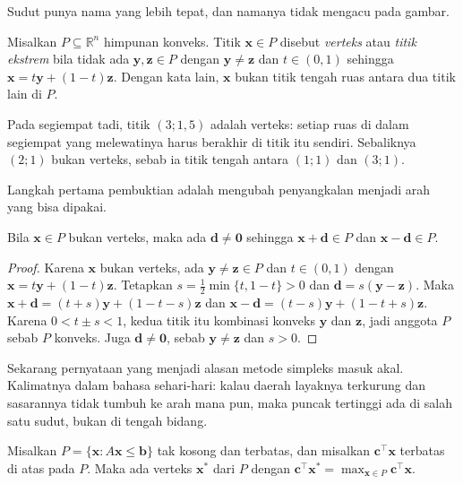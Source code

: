 Sudut punya nama yang lebih tepat, dan namanya tidak mengacu pada gambar.

\begin{definisi}[Verteks]
Misalkan $P\subseteq\mathbb{R}^{n}$ himpunan konveks. Titik $\mathbf{x}\in P$ disebut
\emph{verteks} atau \emph{titik ekstrem} bila tidak ada $\mathbf{y},\mathbf{z}\in P$ dengan
$\mathbf{y}\ne\mathbf{z}$ dan $t\in(0,1)$ sehingga
$\mathbf{x}=t\mathbf{y}+(1-t)\mathbf{z}$. Dengan kata lain, $\mathbf{x}$ bukan titik
tengah ruas antara dua titik lain di $P$.
\end{definisi}

Pada segiempat tadi, titik $(3;1{,}5)$ adalah verteks: setiap ruas di dalam segiempat yang
melewatinya harus berakhir di titik itu sendiri. Sebaliknya $(2;1)$ bukan verteks, sebab ia
titik tengah antara $(1;1)$ dan $(3;1)$.


Langkah pertama pembuktian adalah mengubah penyangkalan menjadi arah yang bisa dipakai.

\begin{lemma}
Bila $\mathbf{x}\in P$ bukan verteks, maka ada $\mathbf{d}\ne\mathbf{0}$ sehingga
$\mathbf{x}+\mathbf{d}\in P$ dan $\mathbf{x}-\mathbf{d}\in P$.
\end{lemma}

\begin{proof}
Karena $\mathbf{x}$ bukan verteks, ada $\mathbf{y}\ne\mathbf{z}\in P$ dan $t\in(0,1)$
dengan $\mathbf{x}=t\mathbf{y}+(1-t)\mathbf{z}$. Tetapkan
$s=\tfrac12\min\{t,1-t\}>0$ dan $\mathbf{d}=s(\mathbf{y}-\mathbf{z})$. Maka
$\mathbf{x}+\mathbf{d}=(t+s)\mathbf{y}+(1-t-s)\mathbf{z}$ dan
$\mathbf{x}-\mathbf{d}=(t-s)\mathbf{y}+(1-t+s)\mathbf{z}$. Karena $0<t\pm s<1$, kedua
titik itu kombinasi konveks $\mathbf{y}$ dan $\mathbf{z}$, jadi anggota $P$ sebab $P$
konveks. Juga $\mathbf{d}\ne\mathbf{0}$, sebab $\mathbf{y}\ne\mathbf{z}$ dan $s>0$.
\end{proof}

Sekarang pernyataan yang menjadi alasan metode simpleks masuk akal. Kalimatnya dalam
bahasa sehari-hari: kalau daerah layaknya terkurung dan sasarannya tidak tumbuh ke arah
mana pun, maka puncak tertinggi ada di salah satu sudut, bukan di tengah bidang.

\begin{teorema}
Misalkan $P=\{\mathbf{x}:A\mathbf{x}\le\mathbf{b}\}$ tak kosong dan terbatas, dan misalkan
$\mathbf{c}^{\top}\mathbf{x}$ terbatas di atas pada $P$. Maka ada verteks
$\mathbf{x}^{*}$ dari $P$ dengan $\mathbf{c}^{\top}\mathbf{x}^{*}
=\max_{\mathbf{x}\in P}\mathbf{c}^{\top}\mathbf{x}$.
\end{teorema}

